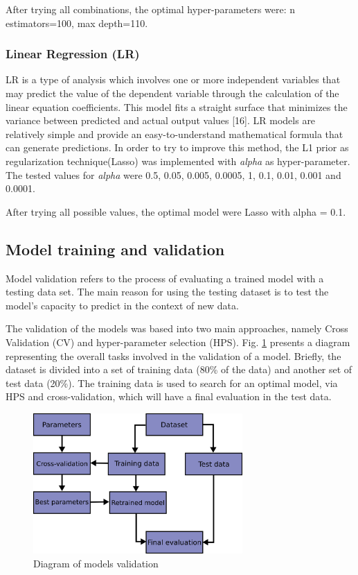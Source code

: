 \documentclass[journal]{IEEEtran} %
\begin{document}
After trying all combinations, the optimal hyper-parameters were: n estimators=100,  max depth=110.\newline

\subsubsection{Linear Regression (LR)}
LR is a type of analysis which involves one or more independent variables that may predict the value of the dependent variable through the calculation of the linear equation coefficients. This model fits a straight surface that minimizes the variance between predicted and actual output values [16]. LR models are relatively simple and provide an easy-to-understand mathematical formula that can generate predictions. In order to try to improve this method, the L1 prior as regularization technique(Lasso) was implemented with \textit{alpha} as hyper-parameter. The tested values for \textit{alpha} were 0.5, 0.05, 0.005, 0.0005, 1, 0.1, 0.01, 0.001 and 0.0001.\newline


After trying all possible values, the optimal model were Lasso with alpha = 0.1.

\subsection{Model training and validation}

Model validation refers to the process of evaluating a trained model with a testing data set. The main reason for using the testing dataset is to test the model's capacity to predict in the context of new data.

The validation of the models was based into two main approaches, namely Cross Validation (CV) and hyper-parameter selection (HPS). Fig. \ref{fig: jdfhla} presents a diagram representing the overall tasks involved in the validation of a model. Briefly, the dataset is divided into a set of training data (80\% of the data) and another set of test data (20\%). The training data is used to search for an optimal model, via HPS and cross-validation, which will have a final evaluation in the test data.

\begin{figure}[htp]
    \centering
    \includegraphics[width=8cm]{Project1-Report_FAA/grid_search_workflow.png}
    \caption{Diagram of models validation}
    \label{fig: jdfhla}
\end{figure}
\end{document}

